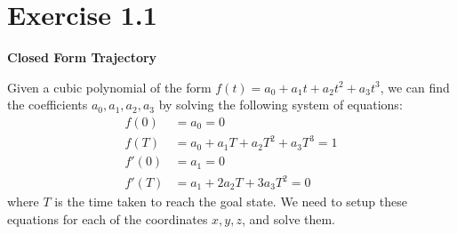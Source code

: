 \section*{Exercise 1.1}

\textbf{Closed Form Trajectory}

Given a cubic polynomial of the form \(f(t) = a_0 + a_1t + a_2t^2 + a_3t^3\), we can find the coefficients \(a_0, a_1, a_2, a_3\) by solving the following system of equations:
\begin{align*}
    f(0)  & = a_0 = 0                          \\
    f(T)  & = a_0 + a_1T + a_2T^2 + a_3T^3 = 1 \\
    f'(0) & = a_1 = 0                          \\
    f'(T) & = a_1 + 2a_2T + 3a_3T^2 = 0
\end{align*}
where \(T\) is the time taken to reach the goal state.
We need to setup these equations for each of the coordinates \(x, y, z\), and solve them.
